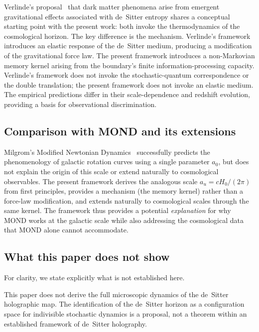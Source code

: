 \documentclass[aps,prd,twocolumn,superscriptaddress,nofootinbib]{revtex4-2}
\begin{document}
Verlinde's proposal~\cite{Verlinde2017} that dark matter phenomena arise from emergent gravitational effects associated with de~Sitter entropy shares a conceptual starting point with the present work: both invoke the thermodynamics of the cosmological horizon. The key difference is the mechanism. Verlinde's framework introduces an elastic response of the de~Sitter medium, producing a modification of the gravitational force law. The present framework introduces a non-Markovian memory kernel arising from the boundary's finite information-processing capacity. Verlinde's framework does not invoke the stochastic-quantum correspondence or the double translation; the present framework does not invoke an elastic medium. The empirical predictions differ in their scale-dependence and redshift evolution, providing a basis for observational discrimination.

\subsection{Comparison with MOND and its extensions}

Milgrom's Modified Newtonian Dynamics~\cite{Milgrom1983} successfully predicts the phenomenology of galactic rotation curves using a single parameter $a_0$, but does not explain the origin of this scale or extend naturally to cosmological observables. The present framework derives the analogous scale $a_u = cH_0/(2\pi)$ from first principles, provides a mechanism (the memory kernel) rather than a force-law modification, and extends naturally to cosmological scales through the same kernel. The framework thus provides a potential \emph{explanation} for why MOND works at the galactic scale while also addressing the cosmological data that MOND alone cannot accommodate.


\subsection{What this paper does not show}

For clarity, we state explicitly what is not established here.

This paper does not derive the full microscopic dynamics of the de~Sitter holographic map. The identification of the de~Sitter horizon as a configuration space for indivisible stochastic dynamics is a proposal, not a theorem within an established framework of de~Sitter holography.
\end{document}
